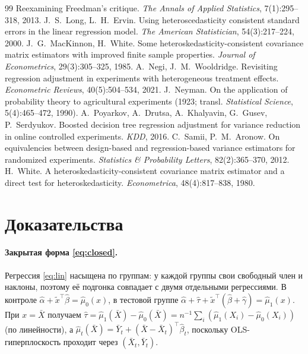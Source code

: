 \documentclass[10pt,a4paper]{article}
\newcommand{\T}{^{\top}}
\begin{document}
\begin{thebibliography}{99}
  Reexamining Freedman's critique. \emph{The Annals of Applied Statistics}, 7(1):295--318, 2013.
 J.~S.~Long, L.~H.~Ervin. Using heteroscedasticity consistent
  standard errors in the linear regression model. \emph{The American Statistician}, 54(3):217--224, 2000.
 J.~G.~MacKinnon, H.~White. Some
  heteroskedasticity-consistent covariance matrix estimators with improved finite sample properties.
  \emph{Journal of Econometrics}, 29(3):305--325, 1985.
 A.~Negi, J.~M.~Wooldridge. Revisiting regression
  adjustment in experiments with heterogeneous treatment effects. \emph{Econometric Reviews}, 40(5):504--534, 2021.
 J.~Neyman. On the application of probability theory to agricultural
  experiments (1923; transl. \emph{Statistical Science}, 5(4):465--472, 1990).
 A.~Poyarkov, A.~Drutsa, A.~Khalyavin, G.~Gusev, P.~Serdyukov.
  Boosted decision tree regression adjustment for variance reduction in online controlled experiments. \emph{KDD}, 2016.
 C.~Samii, P.~M.~Aronow. On equivalencies between design-based
  and regression-based variance estimators for randomized experiments. \emph{Statistics \& Probability Letters},
  82(2):365--370, 2012.
 H.~White. A heteroskedasticity-consistent covariance matrix estimator and a
  direct test for heteroskedasticity. \emph{Econometrica}, 48(4):817--838, 1980.
\end{thebibliography}

\appendix
\section{Доказательства}\label{app:proofs}

\paragraph{Закрытая форма \eqref{eq:closed}.} Регрессия \eqref{eq:lin} насыщена по группам: у каждой группы свои
свободный член и наклоны, поэтому её подгонка совпадает с двумя отдельными регрессиями. В контроле
$\hat\alpha+\tilde x\T\hat\beta=\hat\mu_0(x)$, в тестовой группе $\hat\alpha+\hat\tau+\tilde x\T(\hat\beta+\hat\gamma)=\hat\mu_1(x)$.
При $x=\bar X$ получаем $\hat\tau=\hat\mu_1(\bar X)-\hat\mu_0(\bar X)=n^{-1}\sum_i(\hat\mu_1(X_i)-\hat\mu_0(X_i))$ (по
линейности), а $\hat\mu_t(\bar X)=\bar Y_t+(\bar X-\bar X_t)\T\hat\beta_t$, поскольку OLS-гиперплоскость проходит
через $(\bar X_t,\bar Y_t)$.
\end{document}
